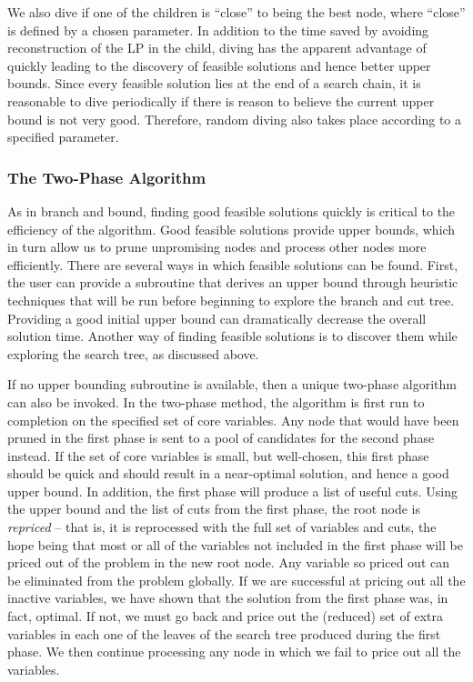 We also dive if one of the children is ``close'' to being the best
node, where ``close'' is defined by a chosen parameter. In addition to
the time saved by avoiding reconstruction of the LP in the child,
diving has the apparent advantage of quickly leading to the discovery
of feasible solutions and hence better upper bounds. Since every
feasible solution lies at the end of a search chain, it is reasonable
to dive periodically if there is reason to believe the current upper
bound is not very good. Therefore, random diving also takes place
according to a specified parameter.

\subsubsection{The Two-Phase Algorithm}
\label{two-phase}

As in branch and bound, finding good feasible solutions quickly is
critical to the efficiency of the algorithm. Good feasible solutions
provide upper bounds, which in turn allow us to prune unpromising
nodes and process other nodes more efficiently. There are several ways
in which feasible solutions can be found. First, the user can provide
a subroutine that derives an upper bound through heuristic techniques
that will be run before beginning to explore the branch and cut tree.
Providing a good initial upper bound can dramatically decrease the
overall solution time. Another way of finding feasible solutions is to
discover them while exploring the search tree, as discussed above.

If no upper bounding subroutine is available, then a unique two-phase
algorithm can also be invoked. In the two-phase method, the algorithm
is first run to completion on the specified set of core variables. Any
node that would have been pruned in the first phase is sent to a pool
of candidates for the second phase instead. If the set of core
variables is small, but well-chosen, this first phase should be quick
and should result in a near-optimal solution, and hence a good upper
bound. In addition, the first phase will produce a list of useful
cuts. Using the upper bound and the list of cuts from the first phase,
the root node is {\em repriced} -- that is, it is reprocessed with the
full set of variables and cuts, the hope being that most or all of the
variables not included in the first phase will be priced out of the
problem in the new root node. Any variable so priced out can be
eliminated from the problem globally. If we are successful at pricing
out all the inactive variables, we have shown that the solution from
the first phase was, in fact, optimal. If not, we must go back and
price out the (reduced) set of extra variables in each one of the
leaves of the search tree produced during the first phase. We then
continue processing any node in which we fail to price out all the
variables. 


